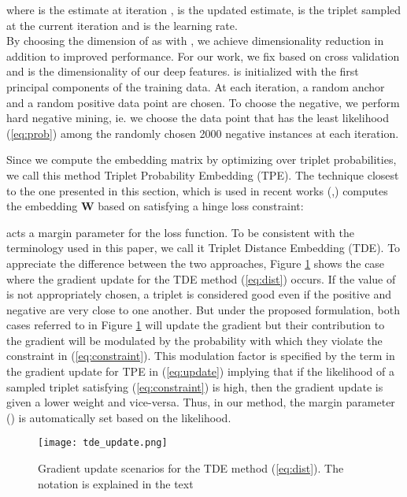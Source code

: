\documentclass[10pt,twocolumn,letterpaper]{article}
\newcommand{\mbf}[1]{\ensuremath{\mathbf{#1}}}
\begin{document}
where  is the estimate at iteration ,  is the
updated estimate,  is the triplet sampled at the current iteration and  is the learning rate.\\ 

By choosing the dimension of  as  with , we achieve
dimensionality reduction in addition to improved performance. For our work, we fix
 based on cross validation and  is the dimensionality of our deep
features.  is initialized with the first  principal components of
the training data. At each iteration, a random anchor and a random positive data
point are chosen. To choose the negative, we perform hard negative mining, ie.
we choose the data point that has the least likelihood (\ref{eq:prob}) among the
randomly chosen 2000 negative instances at each iteration.





Since we compute the embedding matrix  by optimizing over triplet
probabilities, we call this method Triplet Probability Embedding (TPE). The
technique closest to the one presented in this section, which is used in recent
works (\cite{facenet15},\cite{parkhi15}) computes the embedding \mbf{W} based on
satisfying a hinge loss constraint:


 acts a margin parameter for the loss function. To be consistent with
the terminology used in this paper, we call it Triplet Distance Embedding (TDE). To appreciate the difference between the two approaches, Figure \ref{fig:tde} shows the case where the gradient update for the TDE method
(\ref{eq:dist}) occurs. If the value of  is not appropriately chosen, a triplet is considered good even if the positive and negative are very
close to one another. But under the proposed formulation, both cases referred to
in Figure \ref{fig:tde} will update the gradient but their contribution to the
gradient will be modulated by the probability with which they violate the
constraint in  (\ref{eq:constraint}). This modulation factor is specified by the
 term in the gradient update for TPE in (\ref{eq:update}) implying
that if the likelihood of a sampled triplet satisfying (\ref{eq:constraint}) is
high, then the gradient update is given a lower weight and vice-versa. Thus, in
our method, the margin parameter () is automatically set based on the
likelihood. \\


\begin{figure}
\centering
\texttt{[image: tde\_update.png]}
\caption{Gradient update scenarios for the TDE method (\ref{eq:dist}). The notation is explained in the text}
\label{fig:tde}
\end{figure}
\end{document}
